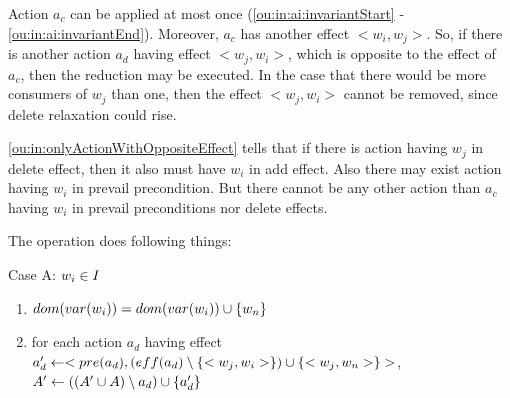 	Action $a_c$ can be applied at most once (\ref{ou:in:ai:invariantStart} - \ref{ou:in:ai:invariantEnd}). Moreover, $a_c$ has another effect $<w_i,w_j>$. So, if there is another action $a_d$ having effect $<w_j,w_i>$, which is opposite to the effect of $a_c$, then the reduction may be executed. In the case that there would be more consumers of $w_j$ than one, then the effect $<w_j,w_i>$ cannot be removed, since delete relaxation could rise.
	
	\ref{ou:in:onlyActionWithOppositeEffect} tells that if there is action having $w_j$ in delete effect, then it also must have $w_i$ in add effect. Also there may exist action having $w_i$ in prevail precondition. But there cannot be any other action than $a_c$ having $w_i$ in prevail preconditions nor delete effects.
	
	The operation does following things:
	
	Case A: $w_i \in I$
		\begin{enumerate}
			\item $dom(var(w_i)) = dom(var(w_i)) \cup \{w_n\}$
			\item for each action $a_d$ having effect $a_d' \leftarrow <pre(a_d),(eff(a_d) \setminus \{<w_j,w_i>\}) \cup \{<w_j,w_n>\}>$, $A{}' \leftarrow ((A' \cup A) \setminus a_d) \cup \{a_d'\}$ 
		\end{enumerate}	
	
